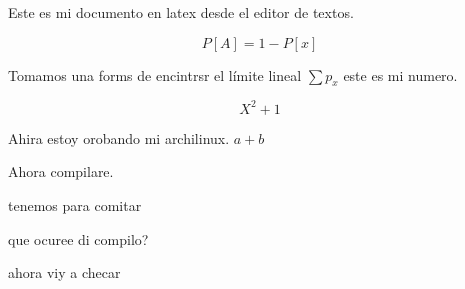 \documentclass{article}
\begin{document}
Este es mi documento en latex desde el editor de textos. 

\begin{displaymath} 
 P[A] = 1 - P[x] 
\end{displaymath} 

 Tomamos una forms de encintrsr el límite lineal
 $ \sum p_x $  este es mi numero.
 
 \begin{displaymath}
    X^2 + 1
 \end{displaymath}
 
 Ahira estoy orobando mi archilinux. $a +b $ 
 
 Ahora compilare. 
 
 
 tenemos para comitar
 
 
 que ocuree di compilo?
 
 ahora viy a checar
\end{document}
